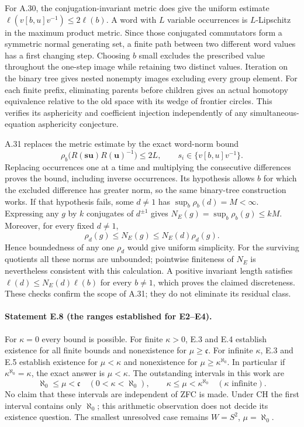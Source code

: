 For A.30, the conjugation-invariant metric does
give the uniform estimate
$\ell(v[b,u]v^{-1})\leq2\ell(b)$. A word with
$L$ variable occurrences is $L$-Lipschitz in the
maximum product metric. Since those conjugated
commutators form a symmetric normal generating
set, a finite path between two different word
values has a first changing step. Choosing $b$
small excludes the prescribed value throughout
the one-step image while retaining two distinct
values. Iteration on the binary tree gives nested
nonempty images excluding every group element.
For each finite prefix, eliminating parents
before children gives an actual homotopy
equivalence relative to the old space with its
wedge of frontier circles. This verifies its
asphericity and coefficient injection independently
of any simultaneous-equation asphericity conjecture.

A.31 replaces the metric estimate by the exact
word-norm bound
\[
 \rho_b\bigl(R(\mathbf s\mathbf u)R(\mathbf u)^{-1}\bigr)
 \leq2L,\qquad
 s_i\in\{v[b,u]v^{-1}\}.
\]
Replacing occurrences one at a time and multiplying
the consecutive differences proves the bound,
including inverse occurrences. Its hypothesis
allows $b$ for which the excluded difference
has greater norm, so the same binary-tree
construction works. If that hypothesis fails,
some $d\ne1$ has $\sup_b\rho_b(d)=M<\infty$.
Expressing any $g$ by $k$ conjugates of $d^{\pm1}$
gives $N_E(g)=\sup_b\rho_b(g)\leq kM$.
Moreover, for every fixed $d\ne1$,
\[
 \rho_d(g)\leq N_E(g)\leq N_E(d)\rho_d(g).
\]
Hence boundedness of any one $\rho_d$ would give
uniform simplicity. For the surviving quotients
all these norms are unbounded; pointwise finiteness
of $N_E$ is nevertheless consistent with this
calculation. A positive invariant length satisfies
$\ell(d)\leq N_E(d)\ell(b)$ for every $b\ne1$,
which proves the claimed discreteness. These
checks confirm the scope of A.31; they do not
eliminate its residual class.

\paragraph{Statement E.8 (the ranges established for E2--E4).}
For $\kappa=0$ every bound is possible. For finite
$\kappa>0$, E.3 and E.4 establish existence for
all finite bounds and nonexistence for
$\mu\geq\mathfrak c$. For infinite $\kappa$,
E.3 and E.5 establish existence for $\mu<\kappa$
and nonexistence for $\mu\geq\kappa^{\aleph_0}$.
In particular if $\kappa^{\aleph_0}=\kappa$,
the exact answer is $\mu<\kappa$.
The outstanding intervals in this work are
\[
 \aleph_0\leq\mu<\mathfrak c
 \quad(0<\kappa<\aleph_0),\qquad
 \kappa\leq\mu<\kappa^{\aleph_0}
 \quad(\kappa\text{ infinite}).
\]
No claim that these intervals are independent of
ZFC is made. Under CH the first interval contains
only $\aleph_0$; this arithmetic observation does
not decide its existence question. The smallest
unresolved case remains $W=S^2$, $\mu=\aleph_0$.

